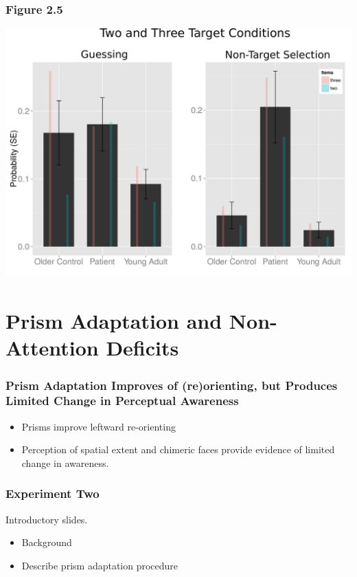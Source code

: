 \documentclass{beamer}
\begin{document}


\section[Prisms]{Prism Adaptation and Non-Attention Deficits}

\begin{frame}
	\frametitle{Prism Adaptation Improves of (re)orienting, but Produces Limited Change in Perceptual Awareness}
	\begin{itemize}
		\item Prisms improve leftward re-orienting
		\item Perception of spatial extent and chimeric faces provide evidence of limited change in awareness.
	\end{itemize}
\end{frame}

\begin{frame}
	\frametitle{Experiment Two}
	Introductory slides.
	\begin{itemize}
		\item Background
		\item Describe prism adaptation procedure
	\end{itemize}

\end{frame}
\end{document}
